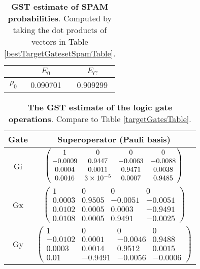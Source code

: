 {\begin{table}[h]
\begin{center}
\begin{tabular}[l]{|c|c|c|}
\hline
 & $E_{0}$ & $E_C$ \\ \hline
$\rho_{0}$ & 0.090701 & 0.909299 \\ \hline
\end{tabular}

\caption{\textbf{GST estimate of SPAM probabilities}.  Computed by taking the dot products of vectors in Table \ref{bestTargetGatesetSpamTable}.\label{bestTargetGatesetSpamParametersTable}}
\end{center}
\end{table}

\begin{table}[h]
\begin{center}
\begin{tabular}[l]{|c|c|}
\hline
Gate & Superoperator (Pauli basis) \\ \hline
Gi & $ \left(\!\!\begin{array}{cccc}
1 & 0 & 0 & 0 \\ 
-0.0009 & 0.9447 & -0.0063 & -0.0088 \\ 
0.0004 & 0.0011 & 0.9471 & 0.0038 \\ 
0.0016 & 3\times 10^{-5} & 0.0007 & 0.9485
 \end{array}\!\!\right) $
 \\ \hline
Gx & $ \left(\!\!\begin{array}{cccc}
1 & 0 & 0 & 0 \\ 
0.0003 & 0.9505 & -0.0051 & -0.0051 \\ 
0.0102 & 0.0005 & 0.0003 & -0.9491 \\ 
0.0108 & 0.0005 & 0.9491 & -0.0025
 \end{array}\!\!\right) $
 \\ \hline
Gy & $ \left(\!\!\begin{array}{cccc}
1 & 0 & 0 & 0 \\ 
-0.0102 & 0.0001 & -0.0046 & 0.9488 \\ 
0.0003 & 0.0014 & 0.9512 & 0.0015 \\ 
0.01 & -0.9491 & -0.0056 & -0.0006
 \end{array}\!\!\right) $
 \\ \hline
\end{tabular}

\caption{\textbf{The GST estimate of the logic gate operations}.  Compare to Table \ref{targetGatesTable}.\label{bestTargetGatesetGatesTable}}
\end{center}
\end{table}

}
